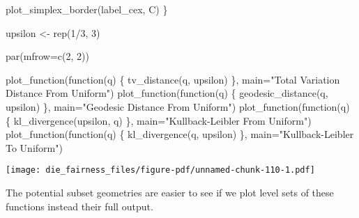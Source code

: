 \documentclass[
  letterpaper,
  DIV=11,
  numbers=noendperiod]{scrartcl}
\newenvironment{Shaded}{\begin{snugshade}}{\end{snugshade}}
\newcommand{\AttributeTok}[1]{\textcolor[rgb]{0.40,0.45,0.13}{#1}}
\newcommand{\ControlFlowTok}[1]{\textcolor[rgb]{0.00,0.23,0.31}{#1}}
\newcommand{\DecValTok}[1]{\textcolor[rgb]{0.68,0.00,0.00}{#1}}
\newcommand{\FunctionTok}[1]{\textcolor[rgb]{0.28,0.35,0.67}{#1}}
\newcommand{\NormalTok}[1]{\textcolor[rgb]{0.00,0.23,0.31}{#1}}
\newcommand{\OtherTok}[1]{\textcolor[rgb]{0.00,0.23,0.31}{#1}}
\newcommand{\SpecialCharTok}[1]{\textcolor[rgb]{0.37,0.37,0.37}{#1}}
\newcommand{\StringTok}[1]{\textcolor[rgb]{0.13,0.47,0.30}{#1}}
\begin{document}
\begin{Shaded}
\begin{Highlighting}[]
  \FunctionTok{plot\_simplex\_border}\NormalTok{(label\_cex, C)}
\NormalTok{\}}
\end{Highlighting}
\end{Shaded}

\begin{Shaded}
\begin{Highlighting}[]
\NormalTok{upsilon }\OtherTok{\textless{}{-}} \FunctionTok{rep}\NormalTok{(}\DecValTok{1}\SpecialCharTok{/}\DecValTok{3}\NormalTok{, }\DecValTok{3}\NormalTok{)}

\FunctionTok{par}\NormalTok{(}\AttributeTok{mfrow=}\FunctionTok{c}\NormalTok{(}\DecValTok{2}\NormalTok{, }\DecValTok{2}\NormalTok{))}

\FunctionTok{plot\_function}\NormalTok{(}\ControlFlowTok{function}\NormalTok{(q) \{ }\FunctionTok{tv\_distance}\NormalTok{(q, upsilon) \},}
              \AttributeTok{main=}\StringTok{"Total Variation Distance From Uniform"}\NormalTok{)}
\FunctionTok{plot\_function}\NormalTok{(}\ControlFlowTok{function}\NormalTok{(q) \{ }\FunctionTok{geodesic\_distance}\NormalTok{(q, upsilon) \},}
              \AttributeTok{main=}\StringTok{"Geodesic Distance From Uniform"}\NormalTok{)}
\FunctionTok{plot\_function}\NormalTok{(}\ControlFlowTok{function}\NormalTok{(q) \{ }\FunctionTok{kl\_divergence}\NormalTok{(upsilon, q) \},}
              \AttributeTok{main=}\StringTok{"Kullback{-}Leibler From Uniform"}\NormalTok{)}
\FunctionTok{plot\_function}\NormalTok{(}\ControlFlowTok{function}\NormalTok{(q) \{ }\FunctionTok{kl\_divergence}\NormalTok{(q, upsilon) \},}
              \AttributeTok{main=}\StringTok{"Kullback{-}Leibler To Uniform"}\NormalTok{)}
\end{Highlighting}
\end{Shaded}

\texttt{[image: die\_fairness\_files/figure-pdf/unnamed-chunk-110-1.pdf]}

The potential subset geometries are easier to see if we plot level sets
of these functions instead their full output.
\end{document}
